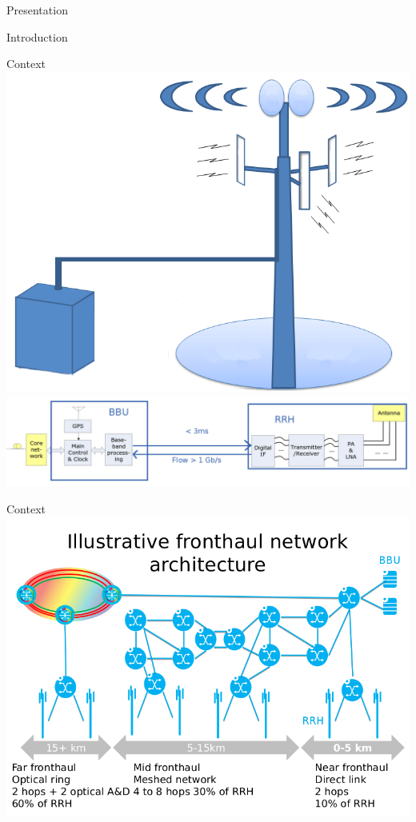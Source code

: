\documentclass[10 pt]{beamer}
\begin{document}
\begin{section}{Presentation}
\begin{subsection}{Introduction}
\begin{frame}{Context}
  \centering
  \includegraphics[scale=0.2]{cloudbts.png}\\
  \includegraphics[scale=0.175]{BBURRH.png}
\end{frame}

\begin{frame}{Context}
  \centering
  \includegraphics[scale=0.38]{fronthaul0.png}
\end{frame}


\end{subsection}
\end{section}
\end{document}
